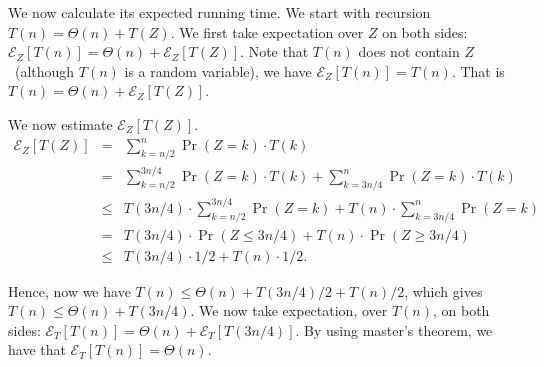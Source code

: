 We now calculate its expected running time.
We start with recursion $T(n) = \Theta(n) + T(Z)$.
We first take expectation over $Z$ on both sides: 
$\mathcal{E}_Z [T(n)] = \Theta(n) + \mathcal{E}_Z [T(Z)]$.
Note that $T(n)$ does not contain $Z$~(although $T(n)$ is a random variable), we have 
$\mathcal{E}_Z [T(n)] = T(n)$. That is
$T(n) = \Theta(n) + \mathcal{E}_Z [T(Z)]$.

We now estimate $\mathcal{E}_Z [T(Z)]$.
\begin{eqnarray*}
\mathcal{E}_Z [T(Z)] & = & \sum_{k = n/2}^n \Pr(Z = k) \cdot T(k) \\
 & = & \sum_{k = n/2}^{3n/4} \Pr(Z = k) \cdot T(k)  + \sum_{k = 3n/4}^{n} \Pr(Z = k) \cdot T(k)  \\
 & \le  & T(3n/4) \cdot \sum_{k = n/2}^{3n/4} \Pr(Z = k)  + T(n) \cdot \sum_{k = 3n/4}^{n} \Pr(Z = k)\\
 & =  & T(3n/4) \cdot \Pr(Z \le 3n/4)  + T(n) \cdot \Pr(Z \ge 3n/4)\\
 & \le  & T(3n/4) \cdot 1/2  + T(n) \cdot 1/2.
\end{eqnarray*}

Hence, now we have $T(n) \le \Theta(n) + T(3n/4)/2 + T(n)/2$, which gives $T(n) \le \Theta(n) + T(3n/4)$.
We now take expectation, over $T(n)$, on both sides:
$\mathcal{E}_T [T(n)] = \Theta(n) + \mathcal{E}_T [T(3n/4)]$.
By using master's theorem, we have that $\mathcal{E}_T [T(n)] = \Theta(n)$.

